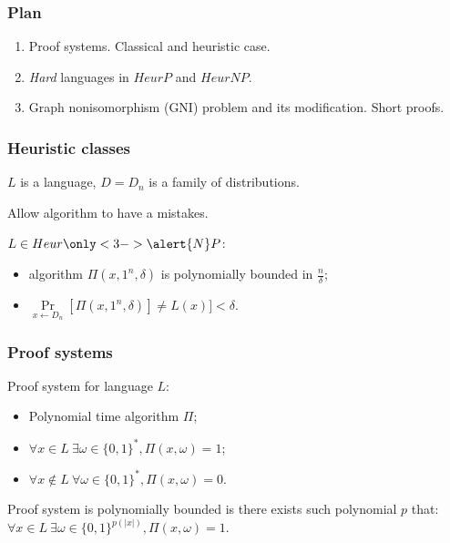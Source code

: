 \begin{frame}
    \frametitle{Plan}

    \begin{enumerate}
	    \item Proof systems. Classical and heuristic case.
    	\item \textit{Hard} languages in $HeurP$ and $HeurNP$.
    	\item Graph nonisomorphism (GNI) problem and its modification. Short proofs.
    \end{enumerate}
\end{frame}


\begin{frame}
    \frametitle{Heuristic classes}

    $L$ is a language, $D = {D_n}$ is a family of distributions.

    Allow algorithm to have a mistakes.

    \pause
    \begin{definition}
        $L \in Heur\only<3->{\alert{N}}P$:
        \begin{itemize}
            \item {} 
		        algorithm $\Pi(x, 1^n, \delta)$ is polynomially bounded in
                $\frac{n}{\delta}$;
            \item $\Pr\limits_{x \gets D_n}[\Pi(x, 1^n, \delta)] \neq
        		L(x)] < \delta$.
        \end{itemize}
    \end{definition}

    \pause

    
\end{frame}


\begin{frame}
	\frametitle{Proof systems}

    \begin{definition}
        Proof system for language $L$:
        \begin{itemize}
            \item Polynomial time algorithm $\Pi$;
            \item $\forall x \in L~ \exists \omega \in \{0, 1\}^{*}, \Pi(x, \omega) = 1$;
        	\item $\forall x \notin L~ \forall \omega \in \{0, 1\}^{*}, 
        		\Pi(x, \omega) = 0$.
        \end{itemize}
    \end{definition}

    \pause
    Proof system is polynomially bounded is there exists such polynomial $p$ that:
    $\forall x \in L~ \exists \omega \in \{0, 1\}^{p(|x|)}, \Pi(x, \omega) = 1$.

\end{frame}


